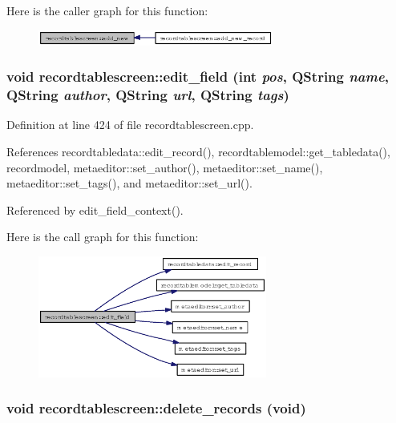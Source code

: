 Here is the caller graph for this function:\begin{figure}[H]
\begin{center}
\leavevmode
\includegraphics[width=219pt]{classrecordtablescreen_e3e3b5770bfdb550262ff4dab723599a_icgraph}
\end{center}
\end{figure}
\subsubsection{\setlength{\rightskip}{0pt plus 5cm}void recordtablescreen::edit\_\-field (int {\em pos}, QString {\em name}, QString {\em author}, QString {\em url}, QString {\em tags})\hspace{0.3cm}{\tt  [private]}}\label{classrecordtablescreen_41863650780dd07b0fc1275f748f78b4}




Definition at line 424 of file recordtablescreen.cpp.

References recordtabledata::edit\_\-record(), recordtablemodel::get\_\-tabledata(), recordmodel, metaeditor::set\_\-author(), metaeditor::set\_\-name(), metaeditor::set\_\-tags(), and metaeditor::set\_\-url().

Referenced by edit\_\-field\_\-context().

Here is the call graph for this function:\begin{figure}[H]
\begin{center}
\leavevmode
\includegraphics[width=213pt]{classrecordtablescreen_41863650780dd07b0fc1275f748f78b4_cgraph}
\end{center}
\end{figure}
\subsubsection{\setlength{\rightskip}{0pt plus 5cm}void recordtablescreen::delete\_\-records (void)\hspace{0.3cm}{\tt  [private]}}\label{classrecordtablescreen_91d1bc4b540ad9af78437a59143e94a4}




